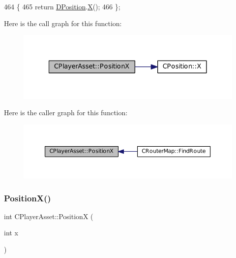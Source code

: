 \begin{DoxyCode}
464                              \{
465             \textcolor{keywordflow}{return} \hyperlink{classCPlayerAsset_aa9f53c009b181c7c5647c6b03776a04c}{DPosition}.\hyperlink{classCPosition_a9a6b94d3b91df1492d166d9964c865fc}{X}();  
466         \};
\end{DoxyCode}
Here is the call graph for this function\+:\nopagebreak
\begin{figure}[H]
\begin{center}
\leavevmode
\includegraphics[width=328pt]{classCPlayerAsset_a9cf8961ac97f2928d1e08bc4f311f220_cgraph}
\end{center}
\end{figure}
Here is the caller graph for this function\+:\nopagebreak
\begin{figure}[H]
\begin{center}
\leavevmode
\includegraphics[width=350pt]{classCPlayerAsset_a9cf8961ac97f2928d1e08bc4f311f220_icgraph}
\end{center}
\end{figure}
\hypertarget{classCPlayerAsset_a3b0981638b2e86e1ffb211365db26b41}{}\label{classCPlayerAsset_a3b0981638b2e86e1ffb211365db26b41} 
\subsubsection{\texorpdfstring{Position\+X()}{PositionX()}\hspace{0.1cm}{\footnotesize\ttfamily [2/2]}}
{\footnotesize\ttfamily int C\+Player\+Asset\+::\+PositionX (\begin{DoxyParamCaption}\item[{int}]{x }\end{DoxyParamCaption})}



